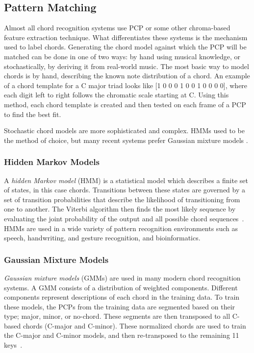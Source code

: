 \documentclass{sig-alternate}
\begin{document}
\subsection{Pattern Matching}

Almost all chord recognition systems use PCP or some other chroma-based feature extraction technique. What differentiates these systems is the mechanism used to label chords. Generating the chord model against which the PCP will be matched can be done in one of two ways: by hand using musical knowledge, or stochastically, by deriving it from real-world music. The most basic way to model chords is by hand, describing the known note distribution of a chord. An example of a chord template for a C major triad looks like [1 0 0 0 1 0 0 1 0 0 0 0], where each digit left to right follows the chromatic scale starting at C. Using this method, each chord template is created and then tested on each frame of a PCP to find the best fit. 

Stochastic chord models are more sophisticated and complex. HMMs used to be the method of choice, but many recent systems prefer Gaussian mixture models \cite{TaeMin:2014}.


\subsubsection{Hidden Markov Models}\label{main} 

A \textit{hidden Markov model} (HMM) is a statistical model which describes a finite set of states, in this case chords. Transitions between these states are governed by a set of transition probabilities that describe the likelihood of transitioning from one to another. The Viterbi algorithm then finds the most likely sequence by evaluating the joint probability of the output and all possible chord sequences~\cite{TaeMin:2014}. HMMs are used in a wide variety of pattern recognition environments such as speech, handwriting, and gesture recognition, and bioinformatics. 


\subsubsection{Gaussian Mixture Models}

\textit{Gaussian mixture models} (GMMs) are used in many modern chord recognition systems. A GMM consists of a distribution of weighted components. Different components represent descriptions of each chord in the training data. To train these models, the PCPs from the training data are segmented based on their type; major, minor, or no-chord. These segments are then transposed to all C-based chords (C-major and C-minor). These normalized chords are used to train the C-major and C-minor models, and then re-transposed to the remaining 11 keys~\cite{TaeMin:2014}.
\end{document}
